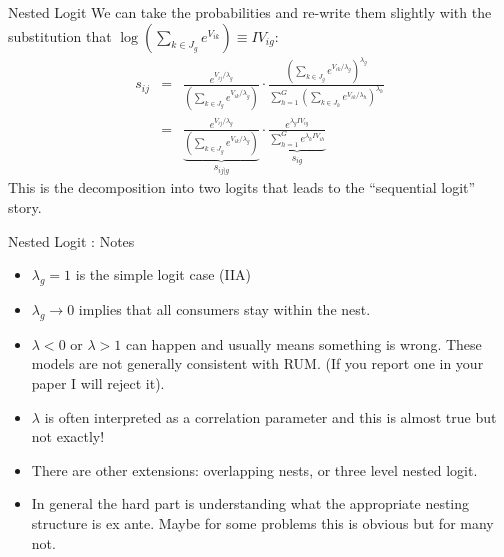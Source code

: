 \documentclass[xcolor=pdftex,dvipsnames,table,mathserif,aspectratio=169]{beamer}
\begin{document}
\begin{frame}{Nested Logit}
We can take the probabilities and re-write them slightly with the substitution that 
$\log \left(\sum_{k \in J_g} e^{V_{ik}} \right)\equiv IV_{ig}$:
\begin{eqnarray*}
s_{ij} &=& \frac{ e^{V_{ij}/\lambda_g}}{ \left(\sum_{k \in J_g} e^{V_{ik}/\lambda_g} \right)}
\cdot
\frac{ \left(\sum_{k \in J_g} e^{V_{ik}/\lambda_g} \right)^{\lambda_g}}{\sum_{h=1}^G \left(\sum_{k \in J_h} e^{V_{ik}/\lambda_h} \right)^{\lambda_h}} \\
&=& \underbrace{\frac{ e^{V_{ij}/\lambda_g}}{ \left(\sum_{k \in J_g} e^{V_{ik}/\lambda_g} \right)}}_{s_{i j | g}}
\cdot
\underbrace{\frac{e^{\lambda_g IV_{ig}}}{\sum_{h=1}^{G} e^{\lambda_h IV_{ih}} }}_{s_{ig}}
\end{eqnarray*}
This is the decomposition into two logits that leads to the ``sequential logit'' story.
\end{frame}

\begin{frame}{Nested Logit : Notes}
\begin{itemize}
\item $\lambda_g=1$ is the simple logit case (IIA)
\item $\lambda_g \rightarrow 0$ implies that all consumers stay within the nest.
\item $\lambda < 0$ or $\lambda > 1$ can happen and usually means something is wrong. These models are not generally consistent with RUM. (If you report one in your paper I will reject it).
\item $\lambda$ is often interpreted as a correlation parameter and this is almost true but not exactly!
\item There are other extensions: overlapping nests, or three level nested logit. 
\item In general the hard part is understanding what the appropriate nesting structure is ex ante. Maybe for some problems this is obvious but for many not.
\end{itemize}
\end{frame}

\end{document}
